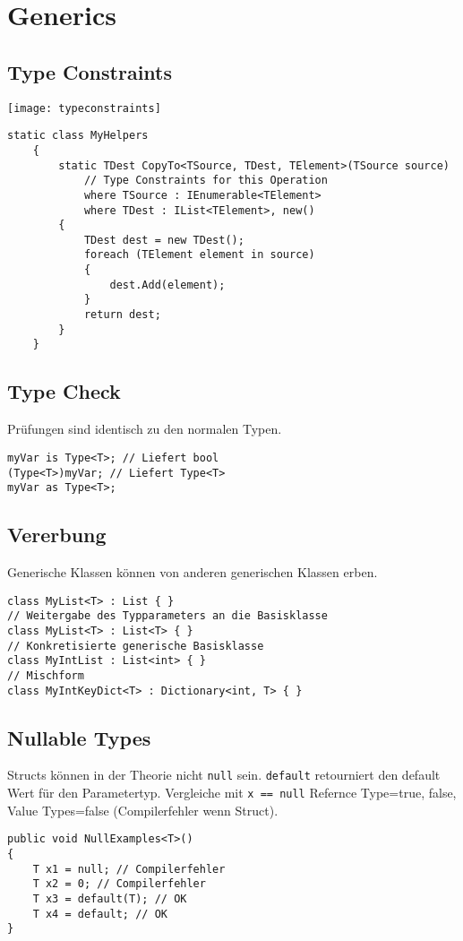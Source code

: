 \section{Generics}

\subsection{Type Constraints}

\texttt{[image: typeconstraints]}

\begin{lstlisting}
static class MyHelpers
    {
        static TDest CopyTo<TSource, TDest, TElement>(TSource source)
        	// Type Constraints for this Operation
            where TSource : IEnumerable<TElement>
            where TDest : IList<TElement>, new()
        {
            TDest dest = new TDest();
            foreach (TElement element in source)
            {
                dest.Add(element);
            }
            return dest;
        }
    }
\end{lstlisting}

\subsection{Type Check}
Prüfungen sind identisch zu den normalen Typen.
\begin{lstlisting}
myVar is Type<T>; // Liefert bool
(Type<T>)myVar; // Liefert Type<T>
myVar as Type<T>;
\end{lstlisting} 

\subsection{Vererbung}
Generische Klassen können von anderen generischen Klassen erben.

\begin{lstlisting}
class MyList<T> : List { }
// Weitergabe des Typparameters an die Basisklasse
class MyList<T> : List<T> { }
// Konkretisierte generische Basisklasse
class MyIntList : List<int> { }
// Mischform
class MyIntKeyDict<T> : Dictionary<int, T> { }
\end{lstlisting}

\subsection{Nullable Types}
Structs können in der Theorie nicht \lstinline{null} sein. \lstinline{default} retourniert den default Wert für den Parametertyp. Vergleiche mit \lstinline{x == null} Refernce Type=true, false, Value Types=false (Compilerfehler wenn Struct).
\begin{lstlisting}
public void NullExamples<T>()
{
	T x1 = null; // Compilerfehler
	T x2 = 0; // Compilerfehler
	T x3 = default(T); // OK 
	T x4 = default; // OK
}
\end{lstlisting}

